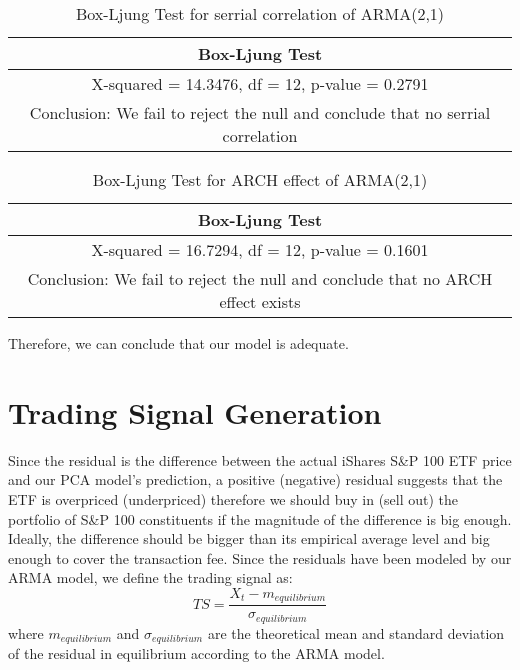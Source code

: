 \documentclass[letterpaper,12pt]{article}
\numberwithin{equation}{section}
\begin{document}
	\begin{table} [!htb] 
		\centering
		\label{Box1-1}
		\begin{tabular}{||c||}
			\hline
			Box-Ljung Test\\
			\hline
			X-squared = 14.3476, df = 12, p-value = 0.2791\\
			Conclusion: We fail to reject the null and conclude that no serrial correlation \\
			\hline
		\end{tabular}
		\caption{Box-Ljung Test for serrial correlation of ARMA(2,1)}
	\end{table}
	\begin{table} [!htb] 
		\centering
		\label{Box1-2}
		\begin{tabular}{||c||}
			\hline
			Box-Ljung Test\\
			\hline
			X-squared = 16.7294, df = 12, p-value = 0.1601\\
			Conclusion: We fail to reject the null and conclude that no ARCH effect exists \\
			\hline
		\end{tabular}
		\caption{Box-Ljung Test for ARCH effect of ARMA(2,1)}
	\end{table}
	
	Therefore, we can conclude that our model is adequate. 
	
\section{Trading Signal Generation}	
	Since the residual is the difference between the actual iShares S\&P 100 ETF price and our PCA model's prediction, a positive (negative) residual suggests that the ETF is overpriced (underpriced) therefore we should buy in (sell out) the portfolio of S\&P 100 constituents if the magnitude of the difference is big enough. Ideally, the difference should be bigger than its empirical average level and big enough to cover the transaction fee. Since the residuals have been modeled by our ARMA model, we define the trading signal as:
	\begin{equation}
		TS = \frac{X_t - m_{equilibrium}}{\sigma_{equilibrium}}
	\end{equation}
	where $m_{equilibrium}$ and $\sigma_{equilibrium}$ are the theoretical mean and standard deviation of the residual in equilibrium according to the ARMA model. 
\end{document}
